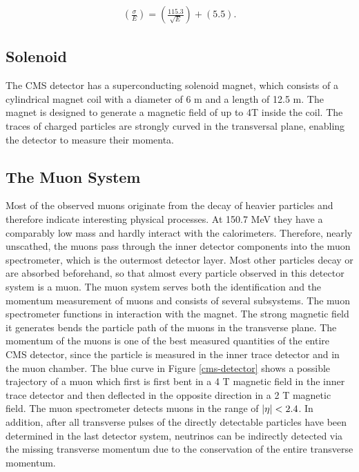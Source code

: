 \documentclass[12pt, a4paper]{thesis}
\begin{document}
\begin{align}
\left( \frac{\sigma}{E} \right) = \left( \frac{115.3}{\sqrt{E}} \right) + (5.5).
\end{align}

\subsection{Solenoid}
\label{sec:org004c39a}
The CMS detector has a superconducting solenoid magnet, which consists
of a cylindrical magnet coil with a diameter of 6 m and a length of
12.5 m.  The magnet is designed to generate a magnetic field of up to
4T inside the coil. The traces of charged particles are strongly
curved in the transversal plane, enabling the detector to measure
their momenta.

\subsection{The Muon System}
\label{sec:org643030a}

Most of the observed muons originate from the decay of heavier
particles and therefore indicate interesting physical processes. At
150.7 MeV they have a comparably low mass and hardly interact with the
calorimeters.  Therefore, nearly unscathed, the muons pass through the
inner detector components into the muon spectrometer, which is the
outermost detector layer. Most other particles decay or are absorbed
beforehand, so that almost every particle observed in this detector
system is a muon. The muon system serves both the identification and
the momentum measurement of muons and consists of several subsystems.
The muon spectrometer functions in interaction with the magnet. The
strong magnetic field it generates bends the particle path of the
muons in the transverse plane. The momentum of the muons is one of the
best measured quantities of the entire CMS detector, since the
particle is measured in the inner trace detector and in the muon
chamber. The blue curve in Figure \ref{cms-detector} shows a possible
trajectory of a muon which first is first bent in a 4 T magnetic field
in the inner trace detector and then deflected in the opposite
direction in a 2 T magnetic field. The muon spectrometer detects muons
in the range of \(\abs{\eta} < 2.4\). In addition, after all
transverse pulses of the directly detectable particles have been
determined in the last detector system, neutrinos can be indirectly
detected via the missing transverse momentum due to the conservation
of the entire transverse momentum.
\end{document}
